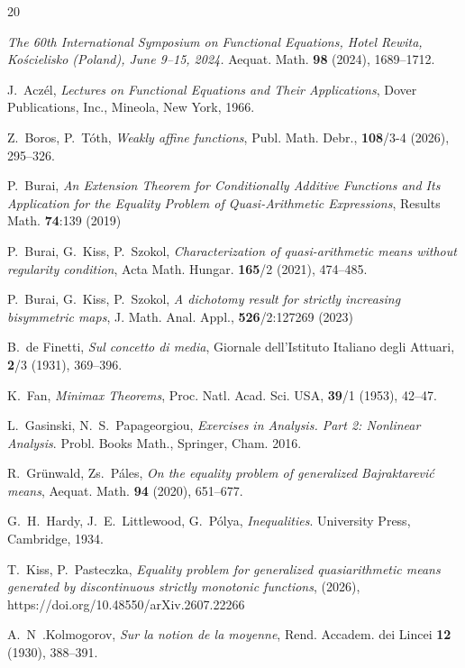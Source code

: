 \documentclass[12pt]{amsart}
\theoremstyle{remark}
\theoremstyle{definition}
\begin{document}
\begin{thebibliography}{20}

{\em The 60th International Symposium 
on Functional Equations, 
Hotel Rewita, Kościelisko (Poland), June 9--15, 2024.} 
Aequat. Math. {\bf 98} (2024), 1689--1712. 

J.~Aczél, 
{\em Lectures on Functional Equations and 
Their Applications},  
Dover Publications, Inc., Mineola, New York, 1966. 

Z.~Boros, P.~Tóth, 
{\em Weakly affine functions}, 
Publ. Math. Debr., {\bf 108}/3-4 (2026), 295--326. 

P.~Burai, 
{\em An Extension Theorem for Conditionally 
Additive Functions and 
Its Application for the Equality Problem of 
Quasi-Arithmetic Expressions}, 
Results Math. {\bf 74}:139 (2019) 

P.~Burai, G.~Kiss, P.~Szokol, 
{\em Characterization of quasi-arithmetic means 
without regularity condition}, 
Acta Math. Hungar. {\bf 165}/2 (2021), 474--485. 

P.~Burai, G.~Kiss, P.~Szokol, 
{\em A dichotomy result for 
strictly increasing bisymmetric maps}, 
J. Math. Anal. Appl., {\bf 526}/2:127269 (2023) 

B.~de Finetti, 
{\em Sul concetto di media}, 
Giornale dell’Istituto Italiano degli Attuari, 
{\bf 2}/3 (1931), 369--396. 

K.~Fan, 
{\em Minimax Theorems}, 
Proc. Natl. Acad. Sci. USA, {\bf 39}/1 (1953), 42--47. 

L.~Gasinski, N.~S.~Papageorgiou, 
{\em Exercises in Analysis. Part 2: Nonlinear Analysis}. 
Probl. Books Math., Springer, Cham. 2016.

R.~Grünwald, Zs.~Páles, 
{\em On the equality problem of 
generalized Bajraktarević means}, 
Aequat. Math. {\bf 94} (2020), 651--677. 

G.~H.~Hardy, J.~E.~Littlewood, G.~P\'olya, 
{\em Inequalities}. 
University Press, Cambridge, 1934. 

T.~Kiss, P.~Pasteczka, 
{\em Equality problem for generalized quasiarithmetic 
means generated by discontinuous 
strictly monotonic functions}, (2026), 
https://doi.org/10.48550/arXiv.2607.22266

A.~N~.Kolmogorov, 
{\em Sur la notion de la moyenne}, 
Rend. Accadem. dei Lincei {\bf 12} (1930), 388--391. 


\end{thebibliography}
\end{document}
